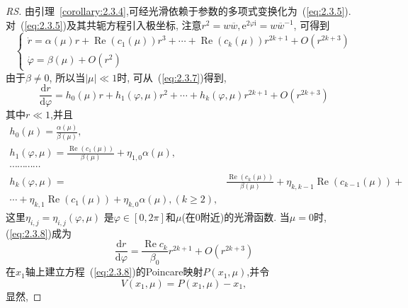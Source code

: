 \begin{proof}[RS]
  由引理~\ref{corollary:2.3.4},可经光滑依赖于参数的多项式变换化为~(\ref{eq:2.3.5}).
  对~(\ref{eq:2.3.5})及其共轭方程引入极坐标,
  注意$r^{2}=w \overline{w}, \mathrm{e}^{2 \varphi \mathrm{i}}=w \overline{w}^{-1}$,
  可得到
  \begin{equation}
    \label{eq:2.3.7}
    \left\{\begin{array}{l}
             
             {\dot{r}=\alpha(\mu) r+\operatorname{Re}\left(c_{1}(\mu)\right) r^{3}+\cdots+\operatorname{Re}\left(c_{k}(\mu)\right) r^{2 k+1}+O\left(r^{2 k+3}\right)} \\
             {\dot{\varphi}=\beta(\mu)+O\left(r^{2}\right)}
           \end{array}\right.
       \end{equation}
       由于$\beta \neq 0$,
       所以当$|\mu| \ll 1$时,
       可从~(\ref{eq:2.3.7})得到,
\begin{equation}
\label{eq:2.3.8}
\frac{\mathrm{d} r}{\mathrm{d} \varphi}=h_{0}(\mu) r+h_{1}(\varphi, \mu) r^{2}+\cdots+h_{k}(\varphi, \mu) r^{2 k+1}+O\left(r^{2 k+3}\right)
\end{equation}
其中$r \ll 1$,并且
\begin{align*}
  h_{0}(\mu)=\frac{\alpha(\mu)}{\beta(\mu)},\\
  h_{1}(\varphi, \mu)=\frac{\operatorname{Re}\left(c_{1}(\mu)\right)}{\beta(\mu)}+\eta_{1,0} \alpha(\mu),\\
  \cdots\cdots\cdots\cdots\\
  h_{k}(\varphi, \mu)=& \frac{\operatorname{Re}\left(c_{k}(\mu)\right)}{\beta(\mu)}+\eta_{k, k-1} \operatorname{Re}\left(c_{k-1}(\mu)\right)+\\
 \cdots+\eta_{k, 1} \operatorname{Re}\left(c_{1}(\mu)\right)+\eta_{k, 0} \alpha(\mu),(k \geqslant 2),
\end{align*}
这里$\eta_{i, j}=\eta_{i, j}(\varphi, \mu)$
是$\varphi \in[0,2 \pi]$和$\mu$(在0附近)的光滑函数.
当$\mu=0$时,
(\ref{eq:2.3.8})成为
\begin{equation}
  \label{eq:2.3.9}
\frac{\mathrm{d} r}{\mathrm{d} \varphi}=\frac{\operatorname{Re} c_{k}}{\beta_{0}} r^{2 k+1}+O\left(r^{2 k+3}\right)
\end{equation}
在$x_1$轴上建立方程~(\ref{eq:2.3.8})的Poincare映射$P(x_1,\mu)$,并令
\begin{equation}
  \label{eq:2.3.10}
  V\left(x_{1}, \mu\right)=P\left(x_{1}, \mu\right)-x_{1},
\end{equation}
显然,

\end{proof}
